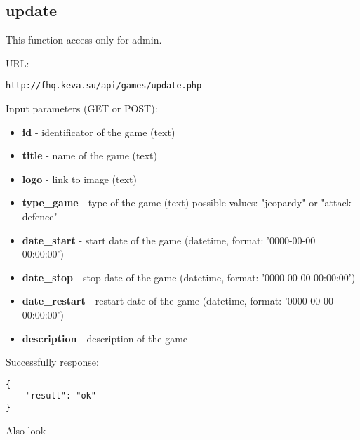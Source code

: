 \subsection{update}
\par

This function access only for admin.

URL:
\begin{Verbatim}[frame=single]
http://fhq.keva.su/api/games/update.php
\end{Verbatim}

Input parameters (GET or POST):
\begin{itemize}
  \item \textbf{id} - identificator of the game (text)
  \item \textbf{title} - name of the game (text)
  \item \textbf{logo} - link to image (text)
  \item \textbf{type\_game} - type of the game (text) possible values: "jeopardy" or "attack-defence"
  \item \textbf{date\_start} - start date of the game (datetime, format:  '0000-00-00 00:00:00')
  \item \textbf{date\_stop} - stop date of the game (datetime, format:  '0000-00-00 00:00:00')
  \item \textbf{date\_restart} - restart date of the game (datetime, format:  '0000-00-00 00:00:00')
  \item \textbf{description} - description of the game
\end{itemize}

Successfully response:  \\
\begin{Verbatim}[frame=single]
{
    "result": "ok"
}
\end{Verbatim}

Also look ~